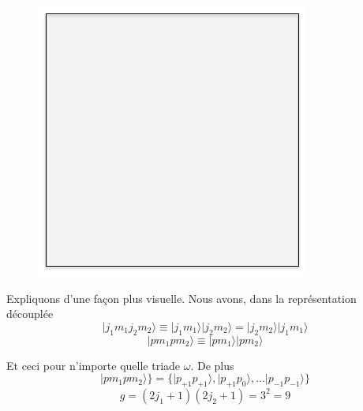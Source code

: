 	\begin{figure}
	\vspace{-5mm}
	\includegraphics[scale=0.4]{ch1/image2}
	\end{figure}
Expliquons d'une façon plus visuelle. Nous avons, dans la représentation découplée
\begin{equation}
\vert j_1 m_1 j_2 m_2  \rangle \equiv 
\vert j_1 m_1 \rangle \vert j_2 m_2 \rangle 
= \vert j_2 m_2 \rangle  \vert j_1 m_1 \rangle
\end{equation}
\begin{equation}
\vert p m_1 p  m_2  \rangle \equiv 
\vert p m_1 \rangle \vert p m_2 \rangle
\end{equation}

Et ceci pour n'importe quelle triade $\omega$. De plus
\begin{equation}
\vert p m_1 p  m_2  \rangle \} =
\{
\vert p_{+1} p_{+1} \rangle ,
\vert p_{+1} p_{0} \rangle , 
\ldots
\vert p_{-1} p_{-1} \rangle \}
\end{equation}
\begin{equation}
g = (2j_1 + 1)(2j_2 +1) = 3^2 = 9
\end{equation}
\ \\

